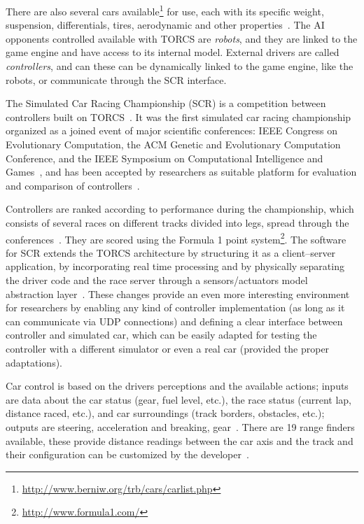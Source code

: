 There are also several cars available\footnote{\url{http://www.berniw.org/trb/cars/carlist.php}} for use, each with its specific weight, suspension, differentials, tires, aerodynamic and other properties~\cite{SIMUTORCS}. The AI opponents controlled available with TORCS are \emph{robots}, and they are linked to the game engine and have access to its internal model. External drivers are called \emph{controllers}, and can these can be dynamically linked to the game engine, like the robots, or communicate through the SCR interface.

The Simulated Car Racing Championship (SCR) is a competition between controllers built on TORCS~\cite{SCR}. It was the first simulated car racing championship organized as a joined event of major scientific conferences: IEEE Congress on Evolutionary Computation, the ACM Genetic and Evolutionary Computation Conference, and the IEEE Symposium on Computational Intelligence and Games~\cite{2009}, and has been accepted by researchers as suitable platform for evaluation and comparison of controllers~\cite{SIMUTORCS}.

Controllers are ranked according to performance during the championship, which consists of several races on different tracks divided into legs, spread through the conferences~\cite{2009}. They are scored using the Formula 1 point system\footnote{\url{http://www.formula1.com/}}. The software for SCR extends the TORCS architecture by structuring it as a client–server application, by incorporating real time processing and by physically separating the driver code and the race server through a sensors/actuators model abstraction layer~\cite{2009}. These changes provide an even more interesting environment for researchers by enabling any kind of controller implementation (as long as it can communicate via UDP connections) and defining a clear interface between controller and simulated car, which can be easily adapted for testing the controller with a different simulator or even a real car (provided the proper adaptations).

Car control is based on the drivers perceptions and the available actions; inputs are data about the car status (gear, fuel level, etc.), the race status (current lap, distance raced, etc.), and car surroundings (track borders, obstacles, etc.); outputs are steering, acceleration and breaking, gear~\cite{SCR}. There are 19 range finders available, these provide distance readings between the car axis and the track and their configuration can be customized by the developer~\cite{SCR}.


